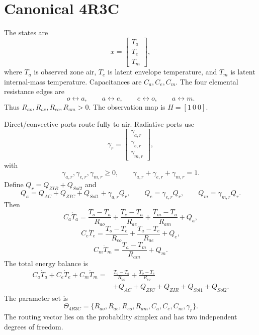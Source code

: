 \documentclass[11pt]{article}
\begin{document}
\section{Canonical 4R3C}
The states are
\[
\boxed{x=\begin{bmatrix}T_a\\T_e\\T_m\end{bmatrix}},
\]
where $T_a$ is observed zone air, $T_e$ is latent envelope temperature, and $T_m$ is latent internal-mass temperature. Capacitances are $C_a,C_e,C_m$. The four elemental resistance edges are
\[
\boxed{o\leftrightarrow a,\qquad a\leftrightarrow e,\qquad e\leftrightarrow o,\qquad a\leftrightarrow m.}
\]
Thus $R_{ao},R_{ae},R_{eo},R_{am}>0$. The observation map is $H=[1\ 0\ 0]$.

Direct/convective ports route fully to air. Radiative ports use
\[
\boxed{\gamma_r=\begin{bmatrix}\gamma_{a,r}\\\gamma_{e,r}\\\gamma_{m,r}\end{bmatrix},}
\]
with
\[
\boxed{\gamma_{a,r},\gamma_{e,r},\gamma_{m,r}\ge0,\qquad\gamma_{a,r}+\gamma_{e,r}+\gamma_{m,r}=1.}
\]
Define $Q_r=Q_{ZIR}+Q_{Sol2}$ and
\[
Q_a=Q_{AC}+Q_{ZIC}+Q_{Sol1}+\gamma_{a,r}Q_r,\qquad
Q_e=\gamma_{e,r}Q_r,\qquad
Q_m=\gamma_{m,r}Q_r.
\]
Then
\[
\boxed{C_a\dot T_a=\frac{T_o-T_a}{R_{ao}}+\frac{T_e-T_a}{R_{ae}}+\frac{T_m-T_a}{R_{am}}+Q_a,}
\tag{4R3C-a}
\]
\[
\boxed{C_e\dot T_e=\frac{T_o-T_e}{R_{eo}}+\frac{T_a-T_e}{R_{ae}}+Q_e,}
\tag{4R3C-e}
\]
\[
\boxed{C_m\dot T_m=\frac{T_a-T_m}{R_{am}}+Q_m.}
\tag{4R3C-m}
\]
The total energy balance is
\[
\boxed{\begin{aligned}
C_a\dot T_a+C_e\dot T_e+C_m\dot T_m={}&\frac{T_o-T_a}{R_{ao}}+\frac{T_o-T_e}{R_{eo}}\\
&+Q_{AC}+Q_{ZIC}+Q_{ZIR}+Q_{Sol1}+Q_{Sol2}.
\end{aligned}}
\]
The parameter set is
\[
\boxed{\Theta_{4R3C}=\{R_{ao},R_{ae},R_{eo},R_{am},C_a,C_e,C_m,\gamma_r\}.}
\]
The routing vector lies on the probability simplex and has two independent degrees of freedom.
\end{document}
